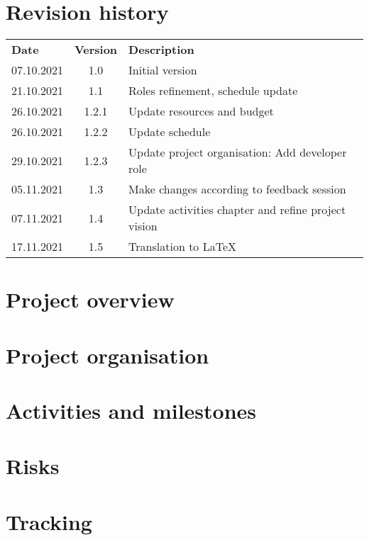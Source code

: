 \documentclass[hidelinks]{report}
\begin{document}
	\maketitle
	
	\chapter*{Revision history}
	
	\begin{table}[H]
		\centering
		\begin{tabularx}{\textwidth}{ l c X }
			\rowcolor[HTML]{C0C0C0}
			\textbf{Date} & \textbf{Version} & \textbf{Description} \\
			07.10.2021 & 1.0   & Initial version \\
			\rowcolor[HTML]{E7E7E7}
			21.10.2021 & 1.1   & Roles refinement, schedule update \\
			26.10.2021 & 1.2.1 & Update resources and budget \\
			\rowcolor[HTML]{E7E7E7}
			26.10.2021 & 1.2.2 & Update schedule \\
			29.10.2021 & 1.2.3 & Update project organisation: Add developer role \\
			\rowcolor[HTML]{E7E7E7}
			05.11.2021 & 1.3   & Make changes according to feedback session \\
			07.11.2021 & 1.4   & Update activities chapter and refine project vision \\
			\rowcolor[HTML]{E7E7E7}
			17.11.2021 & 1.5   & Translation to LaTeX \\
		\end{tabularx}
	\end{table}
	
	\tableofcontents
	
	\chapter{Project overview}\label{chp:overview}
	\thispagestyle{fancy}
	
	
	\chapter{Project organisation}\label{chp:organisation}
	\thispagestyle{fancy}
	
	
	\chapter{Activities and milestones}\label{chp:activities}
	\thispagestyle{fancy}
	
	
	\chapter{Risks}\label{chp:risks}
	\thispagestyle{fancy}
	
	
	\chapter{Tracking}\label{chp:tracking}
	\thispagestyle{fancy}
	
\end{document}
